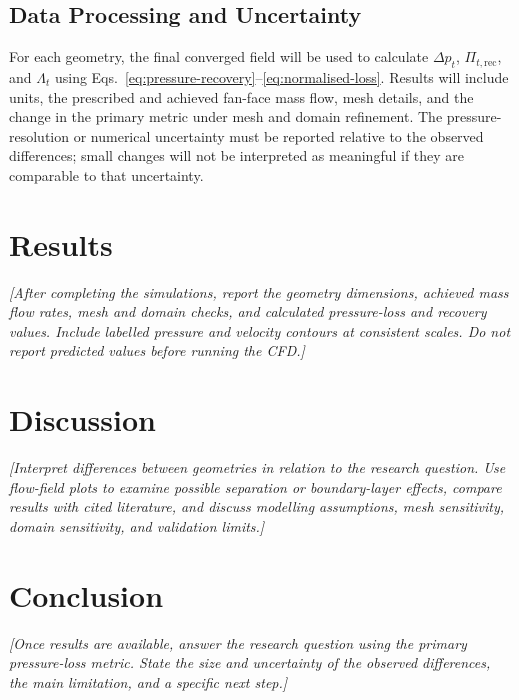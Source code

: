 \documentclass[11pt]{article}
\begin{document}
\subsection{Data Processing and Uncertainty}
For each geometry, the final converged field will be used to calculate $\Delta p_t$, $\Pi_{t,\mathrm{rec}}$, and $\Lambda_t$ using Eqs.~\ref{eq:pressure-recovery}--\ref{eq:normalised-loss}. Results will include units, the prescribed and achieved fan-face mass flow, mesh details, and the change in the primary metric under mesh and domain refinement. The pressure-resolution or numerical uncertainty must be reported relative to the observed differences; small changes will not be interpreted as meaningful if they are comparable to that uncertainty.

\section{Results}
\emph{[After completing the simulations, report the geometry dimensions, achieved mass flow rates, mesh and domain checks, and calculated pressure-loss and recovery values. Include labelled pressure and velocity contours at consistent scales. Do not report predicted values before running the CFD.]}

\section{Discussion}
\emph{[Interpret differences between geometries in relation to the research question. Use flow-field plots to examine possible separation or boundary-layer effects, compare results with cited literature, and discuss modelling assumptions, mesh sensitivity, domain sensitivity, and validation limits.]}

\section{Conclusion}
\emph{[Once results are available, answer the research question using the primary pressure-loss metric. State the size and uncertainty of the observed differences, the main limitation, and a specific next step.]}

\printbibliography[heading=bibintoc,title={References}]
\end{document}
